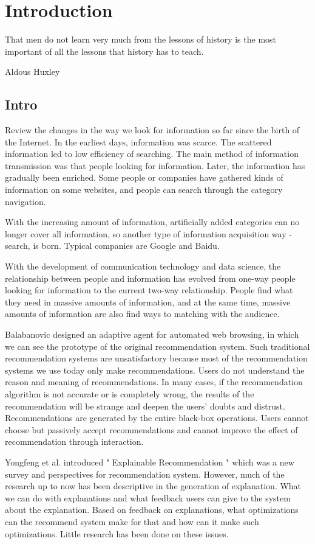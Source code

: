 \section{Introduction}
\label{ch:intro}

\epigraph{That men do not learn very much from the lessons of history is the most important of all the lessons that history has to teach.}{Aldous Huxley}

\subsection{Intro}
Review the changes in the way we look for information so far since the birth of the Internet. In the earliest days, information was scarce. The scattered information led to low efficiency of searching. The main method of information transmission was that people looking for information. Later, the information has gradually been enriched. Some people or companies have gathered kinds of information on some websites, and people can search through the category navigation.
\par With the increasing amount of information, artificially added categories can no longer cover all information, so another type of information acquisition way - search, is born. Typical companies are Google and Baidu.
\par With the development of communication technology and data science, the relationship between people and information has evolved from one-way people looking for information to the current two-way relationship. People find what they need in massive amounts of information, and at the same time, massive amounts of information are also find ways to matching with the audience.
\par Balabanovic designed an adaptive agent for automated web browsing\cite{balabanovic1996adaptive}, in which we can see the prototype of the original recommendation system. Such traditional recommendation systems are unsatisfactory because most of the recommendation systems we use today only make recommendations. Users do not understand the reason and meaning of recommendations. In many cases, if the recommendation algorithm is not accurate or is completely wrong, the results of the recommendation will be strange and deepen the users' doubts and distrust. Recommendations are generated by the entire black-box operations. Users cannot choose but passively accept recommendations and cannot improve the effect of recommendation through interaction.
\par Yongfeng et al. introduced " Explainable Recommendation " which was a new survey and perspectives for recommendation system\cite{zhang2018explainable}. However, much of the research up to now has been descriptive in the generation of explanation. What we can do with explanations and what feedback users can give to the system about the explanation. Based on feedback on explanations, what optimizations can the recommend system make for that and how can it make such optimizations. Little research has been done on these issues.
